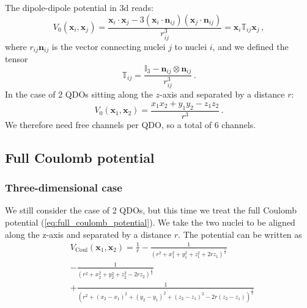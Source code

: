 \documentclass[reprint, amsmath, amssymb, aps]{revtex4-2}
\begin{document}
            The dipole-dipole potential in 3d reads:
            \begin{equation}
                V_0(\bm{x} _i, \bm{x} _j) = \frac{\bm{x} _i\cdot \bm{x} _j - 3 (\bm{x} _i\cdot \bm{n} _{ij})(\bm{x} _j\cdot \bm{n} _{ij})}{r_{ij}^3}=\bm{x} _i \mathbb T_{ij} \bm{x} _j\,,
            \end{equation}
            where $r_{ij}\bm{n} _{ij}$ is the vector connecting nuclei $j$ to nuclei $i$, and we defined the tensor
            \begin{equation}
                \mathbb T_{ij} = \frac{\mathbb I_3 - \bm{n} _{ij}\otimes\bm{n} _{ij}}{r_{ij}^3}\,.
            \end{equation}
            In the case of 2 QDOs sitting along the $z$-axis and separated by a distance $r$:
            \begin{equation}
                V_0(\bm{x} _1, \bm{x} _2) = \frac{x_1x_2 + y_1y_2 - z_1z_2}{r^3}\,.
            \end{equation}
            We therefore need free channels per QDO, so a total of 6 channels.
        \subsection{Full Coulomb potential}

            \subsubsection{Three-dimensional case}

                We still consider the case of 2 QDOs, but this time we treat the full Coulomb potential (\ref{eq:full_coulomb_potential}). We take the two nuclei to be aligned along the z-axis and separated by a distance $r$. The potential can be written as
                \begin{equation}
                \begin{split}
                    &V_\text{Coul}(\bm{x} _1, \bm{x} _2) = \frac{1}{r} - \frac{1}{\left(r^2 + x_1^2+y_1^2+z_1^2+2rz_1\right)^{\frac{1}{2}}} \\
                    &- \frac{1}{\left(r^2 + x_2^2+y_2^2+z_2^2-2rz_2\right)^{\frac{1}{2}}} \\
                    &+\frac{1}{\left(r^2 + (x_2-x_1)^2+(y_2-y_1)^2+(z_2-z_1)^2-2r(z_2-z_1)\right)^{\frac{1}{2}}}
                \end{split}
                \end{equation}
\end{document}
